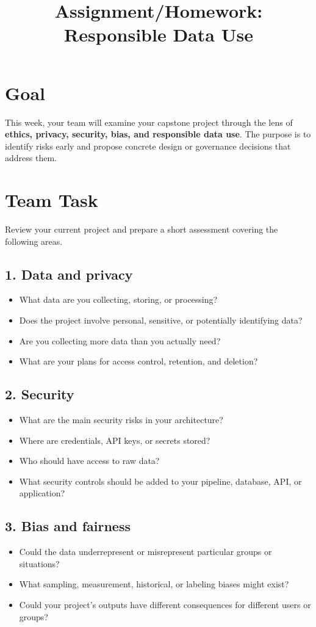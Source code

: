 \documentclass[12pt]{article}
\title{Assignment/Homework: Responsible Data Use}
\author{}
\date{}
\begin{document}
\maketitle
\vspace{-1.5em}

\section*{Goal}
This week, your team will examine your capstone project through the lens of \textbf{ethics, privacy, security, bias, and responsible data use}. The purpose is to identify risks early and propose concrete design or governance decisions that address them.

\section*{Team Task}
Review your current project and prepare a short assessment covering the following areas.

\subsection*{1. Data and privacy}
\begin{itemize}
  \item What data are you collecting, storing, or processing?
  \item Does the project involve personal, sensitive, or potentially identifying data?
  \item Are you collecting more data than you actually need?
  \item What are your plans for access control, retention, and deletion?
\end{itemize}

\subsection*{2. Security}
\begin{itemize}
  \item What are the main security risks in your architecture?
  \item Where are credentials, API keys, or secrets stored?
  \item Who should have access to raw data?
  \item What security controls should be added to your pipeline, database, API, or application?
\end{itemize}

\subsection*{3. Bias and fairness}
\begin{itemize}
  \item Could the data underrepresent or misrepresent particular groups or situations?
  \item What sampling, measurement, historical, or labeling biases might exist?
  \item Could your project's outputs have different consequences for different users or groups?
\end{itemize}
\end{document}
